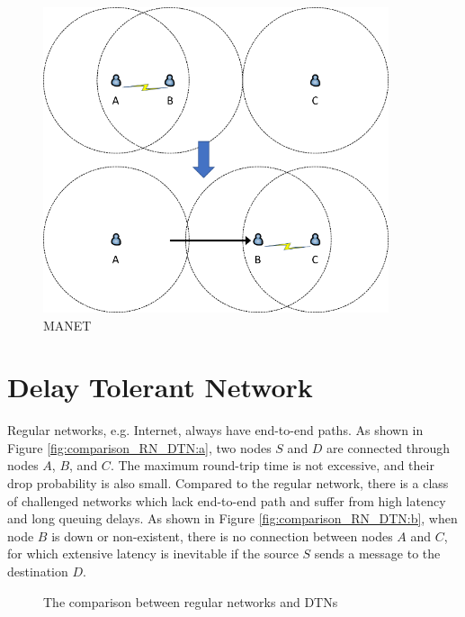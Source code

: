 \begin{figure} [H]
  \centering 
  \includegraphics[width=4.0in]{figures/FIG_MANET.png}
  \caption{MANET} 
  \label{fig:MANET} %
\end{figure}

\section{ Delay Tolerant Network}

\noindent Regular networks, e.g. Internet, always have end-to-end paths. As shown in Figure \ref{fig:comparison_RN_DTN:a}, two nodes $S$ and $D$ are connected through nodes $A$, $B$, and $C$. The maximum round-trip time is not excessive, and their drop probability is also small. Compared to the regular network, there is a class of challenged networks \cite {C1} which lack end-to-end path and suffer from high latency and long queuing delays. As shown in Figure \ref{fig:comparison_RN_DTN:b}, when node $B$ is down or non-existent, there is no connection between nodes $A$ and $C$, for which extensive latency is inevitable if the source $S$ sends a message to the destination $D$.

\begin{figure} [H]
  \centering 
  \hspace{1in} 
  \caption{The comparison between regular networks and DTNs} 
  \label{fig:comparison_RN_DTN} %
\end{figure}

